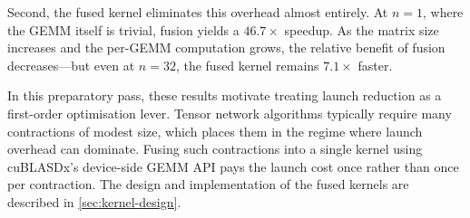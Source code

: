 Second, the fused kernel eliminates this overhead almost entirely. At $n = 1$,
where the GEMM itself is trivial, fusion yields a $46.7\times$ speedup. As the
matrix size increases and the per-GEMM computation grows, the relative benefit
of fusion decreases---but even at $n = 32$, the fused kernel remains
$7.1\times$ faster.

In this preparatory pass, these results motivate treating launch reduction as a
first-order optimisation lever. Tensor network algorithms typically require many
contractions of modest size, which places them in the regime where launch
overhead can dominate. Fusing such contractions into a single kernel using
cuBLASDx's device-side GEMM API pays the launch cost once rather than once per
contraction. The design and implementation of the fused kernels are described
in \cref{sec:kernel-design}.
